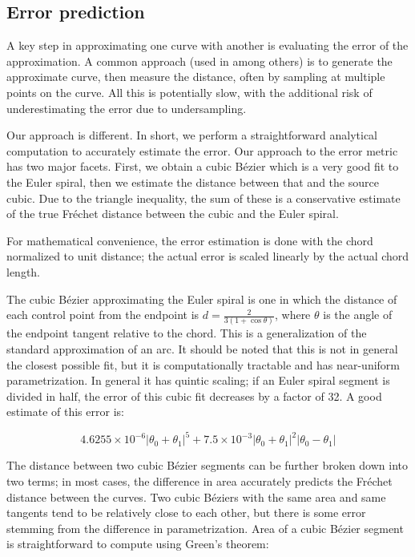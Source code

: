 \documentclass[sigconf]{acmart}
\begin{document}
\subsection{Error prediction}

A key step in approximating one curve with another is evaluating the error of the approximation. A common approach (used in \citet{Nehab2020} among others) is to generate the approximate curve, then measure the distance, often by sampling at multiple points on the curve. All this is potentially slow, with the additional risk of underestimating the error due to undersampling.

Our approach is different. In short, we perform a straightforward analytical computation to accurately estimate the error. Our approach to the error metric has two major facets. First, we obtain a cubic Bézier which is a very good fit to the Euler spiral, then we estimate the distance between that and the source cubic. Due to the triangle inequality, the sum of these is a conservative estimate of the true Fréchet distance between the cubic and the Euler spiral.

For mathematical convenience, the error estimation is done with the chord normalized to unit distance; the actual error is scaled linearly by the actual chord length.

The cubic Bézier approximating the Euler spiral is one in which the distance of each control point from the endpoint is $d = \frac{2}{3(1 + \cos \theta)}$, where $\theta$ is the angle of the endpoint tangent relative to the chord. This is a generalization of the standard approximation of an arc. It should be noted that this is not in general the closest possible fit, but it is computationally tractable and has near-uniform parametrization. In general it has quintic scaling; if an Euler spiral segment is divided in half, the error of this cubic fit decreases by a factor of 32. A good estimate of this error is:

\[
    4.6255\times10^{-6}|\theta_0+\theta_1|^5 + 7.5\times10^{-3}|\theta_0+\theta_1|^2|\theta_0-\theta_1|
\]



The distance between two cubic Bézier segments can be further broken down into two terms; in most cases, the difference in area accurately predicts the Fréchet distance between the curves. Two cubic Béziers with the same area and same tangents tend to be relatively close to each other, but there is some error stemming from the difference in parametrization. Area of a cubic Bézier segment is straightforward to compute using Green's theorem:
\end{document}
